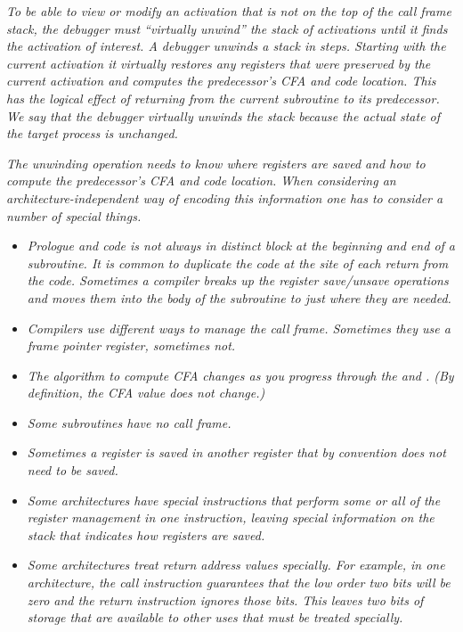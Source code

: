 \textit{To be able to view or modify an activation that is not
on the top of the call frame stack, the debugger must
``virtually unwind'' the stack of activations until
it finds the activation of interest.  A debugger unwinds
a stack in steps. Starting with the current activation it
virtually restores any registers that were preserved by the
current activation and computes the predecessor\textquoteright s CFA and
code location. This has the logical effect of returning from
the current subroutine to its predecessor. We say that the
debugger virtually unwinds the stack because the actual state
of the target process is unchanged.}

\textit{The unwinding operation needs to know where registers are
saved and how to compute the predecessor\textquoteright s CFA and code
location. When considering an architecture-independent way
of encoding this information one has to consider a number of
special things.}


\begin{itemize} %

\item \textit{Prologue 
and 
 code is not always in 
distinct block
at the beginning and end of a subroutine. It is common
to duplicate the  code 
at the site of each return
from the code. Sometimes a compiler breaks up the register
save/unsave operations and moves them into the body of the
subroutine to just where they are needed.}


\item \textit{Compilers use different ways to manage the call
frame. Sometimes they use a frame pointer register, sometimes
not.}

\item \textit{The algorithm to compute CFA changes as you progress through
the  
and . 
(By definition, the CFA value
does not change.)}

\item \textit{Some subroutines have no call frame.}

\item \textit{Sometimes a register is saved in another register that by
convention does not need to be saved.}

\item \textit{Some architectures have special instructions that perform
some or all of the register management in one instruction,
leaving special information on the stack that indicates how
registers are saved.}

\item \textit{Some architectures treat return address values specially. For
example, in one architecture, the call instruction guarantees
that the low order two bits will be zero and the return
instruction ignores those bits. This leaves two bits of
storage that are available to other uses that must be treated
specially.}


\end{itemize}


